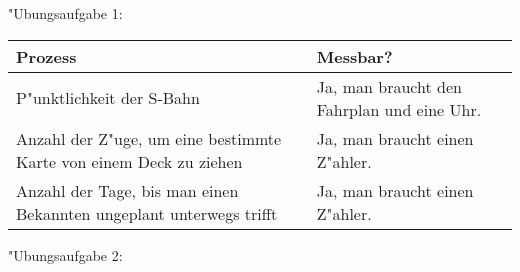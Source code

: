 \documentclass[fleqn,a4paper,12pt]{article}
\begin{document}
"Ubungsaufgabe 1: \newline

\begin{center}
\begin{tabular}{|p{10cm}|p{5cm}|}
	\hline \textbf{Prozess} & \textbf{Messbar?} \\
	\hline P"unktlichkeit der S-Bahn & Ja, man braucht den Fahrplan und eine Uhr. \\
	\hline Anzahl der Z"uge, um eine bestimmte Karte von einem Deck zu ziehen & Ja, man braucht einen Z"ahler. \\
	\hline Anzahl der Tage, bis man einen Bekannten ungeplant unterwegs trifft & Ja, man braucht einen Z"ahler. \\
	\hline
\end{tabular}
\end{center}

"Ubungsaufgabe 2: \newline
\end{document}
